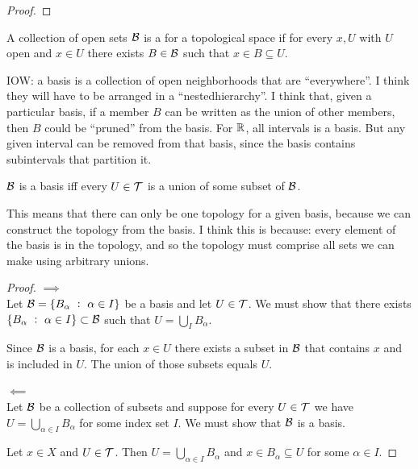 \begin{proof}
\end{proof}

\begin{definition}[basis]
  A collection of open sets $\mathcal B$ is a  for a topological space if for every $x, U$ with
  $U$ open and $x \in U$ there exists $B \in \mathcal B$ such that $x \in B \subseteq U$.
\end{definition}

IOW: a basis is a collection of open neighborhoods​ that are ``everywhere​''. I think they will have to be arranged
in a ``nested​ hierarchy​''. I think that, given a particular basis, if a member $B$ can be written as the union of
other members, then $B$ could be ``pruned​'' from the basis. For $\mathbb{R}$, all intervals is a basis. But any given
interval can be removed from that basis, since the basis contains subintervals that partition it.


\begin{lemma}
  $\mathcal B$ is a basis iff every $U \in \mathcal T$ is a union of some subset of $\mathcal B$.
\end{lemma}

\begin{remark}
  This means that there can only be one topology for a given basis, because we can construct the
  topology from the basis. I think this is because: every element of the basis is in the topology,
  and so the topology must comprise all sets we can make using arbitrary unions.
\end{remark}

\begin{proof}
  $\implies$\\
  Let $\mathcal B = \{B_\alpha ~:~ \alpha \in I\}$ be a basis and let $U \in \mathcal T$. We must show that
  there exists $\{B_\alpha ~:~ \alpha \in I\} \subset \mathcal B$ such that $U = \bigcup_I B_\alpha$.

  Since $\mathcal B$ is a basis, for each $x \in U$ there exists a subset in $\mathcal B$ that contains $x$
  and is included in $U$. The union of those subsets equals $U$.

  $\impliedby$\\
  Let $\mathcal B$ be a collection of subsets and suppose for every $U \in \mathcal T$ we
  have $U = \bigcup_{\alpha \in I} B_\alpha$ for some index set $I$. We must show that $\mathcal B$ is a
  basis.

  Let $x \in X$ and $U \in \mathcal T$. Then $U = \bigcup_{\alpha \in I} B_\alpha$
  and $x \in B_\alpha \subseteq U$ for some $\alpha \in I$.
\end{proof}

